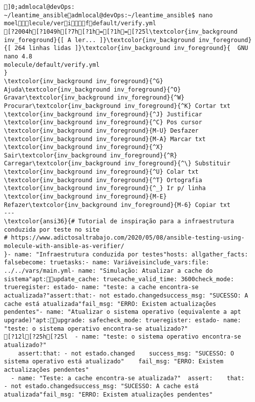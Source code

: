 \documentclass{scrartcl}
\title{}
\begin{document}
\begin{Verbatim}
]0;admlocal@devOps: ~/leantime_ansibleadmlocal@devOps:~/leantime_ansible$ nano moellecule/verifdefault/verify.yml 
[?2004h[?1049h[?7h[?1h=[?1h=[?25l\textcolor{inv_background inv_foreground}{[ A ler... ]}\textcolor{inv_background inv_foreground}{[ 264 linhas lidas ]}\textcolor{inv_background inv_foreground}{  GNU nano 4.8                                          molecule/default/verify.yml                                                       }
\textcolor{inv_background inv_foreground}{^G} Ajuda\textcolor{inv_background inv_foreground}{^O} Gravar\textcolor{inv_background inv_foreground}{^W} Procurar\textcolor{inv_background inv_foreground}{^K} Cortar txt    \textcolor{inv_background inv_foreground}{^J} Justificar    \textcolor{inv_background inv_foreground}{^C} Pos cursor    \textcolor{inv_background inv_foreground}{M-U} Desfazer     \textcolor{inv_background inv_foreground}{M-A} Marcar txt
\textcolor{inv_background inv_foreground}{^X} Sair\textcolor{inv_background inv_foreground}{^R} Carregar\textcolor{inv_background inv_foreground}{^\} Substituir    \textcolor{inv_background inv_foreground}{^U} Colar txt     \textcolor{inv_background inv_foreground}{^T} Ortografia    \textcolor{inv_background inv_foreground}{^_} Ir p/ linha   \textcolor{inv_background inv_foreground}{M-E} Refazer\textcolor{inv_background inv_foreground}{M-6} Copiar txt
---
\textcolor{ansi36}{# Tutorial de inspiração para a infraestrutura conduzida por teste no site
# https://www.adictosaltrabajo.com/2020/05/08/ansible-testing-using-molecule-with-ansible-as-verifier/
}- name: "Infraestrutura conduzida por testes"hosts: allgather_facts: falsebecome: truetasks:- name: Variáveisinclude_vars:file: ../../vars/main.yml- name: "Simulação: Atualizar a cache do sistema"apt:update_cache: truecache_valid_time: 3600check_mode: trueregister: estado- name: "teste: a cache encontra-se actualizada?"assert:that:- not estado.changedsuccess_msg: "SUCESSO: A cache está atualizada"fail_msg: "ERRO: Existem actualizações pendentes"- name: "Atualizar o sistema operativo (equivalente a apt upgrade)"apt:upgrade: safecheck_mode: trueregister: estado- name: "teste: o sistema operativo encontra-se atualizado?"
[?12l[?25h[?25l  - name: "teste: o sistema operativo encontra-se atualizado?"
    assert:that: - not estado.changed    success_msg: "SUCESSO: O sistema operativo está atualizado"    fail_msg: "ERRO: Existem actualizações pendentes"
  - name: "Teste: a cache encontra-se atualizada?"  assert:    that:  - not estado.changedsuccess_msg: "SUCESSO: A cache está atualizada"fail_msg: "ERRO: Existem atualizações pendentes"

\end{Verbatim}
\end{document}
